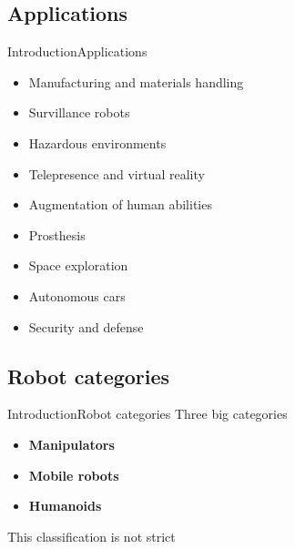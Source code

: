 \documentclass[10pt,compress]{beamer} %
\begin{document}
\subsection{Applications}
\begin{frame}{Introduction}{Applications}
	\begin{itemize}
		\item Manufacturing and materials handling
		\item Survillance robots
		\item Hazardous environments
		\item Telepresence and virtual reality
		\item Augmentation of human abilities
		\item Prosthesis
		\item Space exploration
		\item Autonomous cars
		\item Security and defense
	\end{itemize}
\end{frame}

\subsection{Robot categories}
\begin{frame}{Introduction}{Robot categories}
	Three big categories
	\begin{itemize}
		\item \textbf{Manipulators}
		\item \textbf{Mobile robots}
		\item \textbf{Humanoids}
	\end{itemize}
	This classification is not strict
\end{frame}
\end{document}
